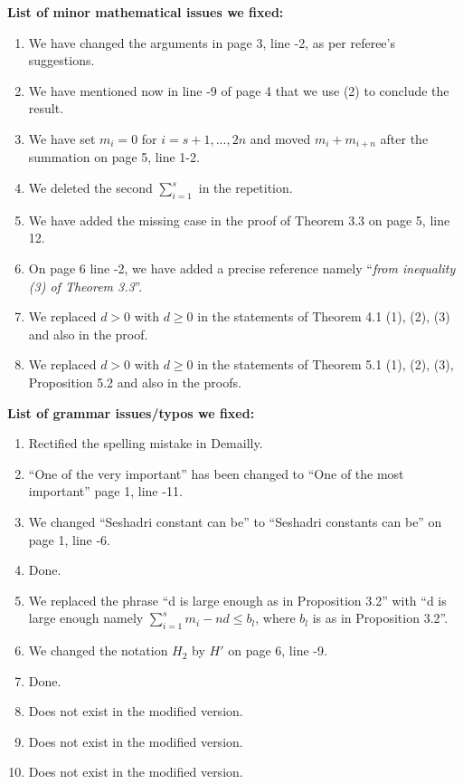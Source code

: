 \documentclass[12pt,twoside,reqno]{amsart}
\numberwithin{equation}{section}
\theoremstyle{definition}
\begin{document}
\textbf{List of minor mathematical issues we fixed:}
\begin{enumerate}
 \item We have changed the arguments in page 3, line -2, as per referee's suggestions.  
 \item We have mentioned now in line -9 of page 4 that we use (2) to conclude the result. 
 \item We have set $m_i = 0$ for $i = s+1,..., 2n$ and moved $m_i + m_{i+n}$ after the summation on page 5, line 1-2. 
 \item We deleted the second $\sum\limits_{i=1}^s$ in the repetition. 
 \item We have added the missing case in the proof of Theorem 3.3 on page 5, line 12. 
 \item On page 6 line -2, we have added a precise reference namely ``\textit{from inequality (3) of Theorem 3.3}''. 
 \item We replaced $d>0$ with $d \geq 0$ in the statements of Theorem 4.1 (1), (2), (3) and also in the proof. 
 \item We replaced $d>0$ with $d \geq 0$ in the statements of Theorem 5.1 (1), (2), (3), Proposition 5.2 and also in the proofs. 
\end{enumerate}

\textbf{List of grammar issues/typos we fixed:}
\begin{enumerate}
 \item Rectified the spelling mistake in Demailly. 
 \item ``One of the very important'' has been changed to ``One of the most important'' page 1, line -11.
 \item We changed ``Seshadri constant can be'' to ``Seshadri constants can be'' on page 1, line -6.
 \item Done.
 \item We replaced the phrase ``d is large enough as in Proposition 3.2'' with ``d is large enough namely 
 $\sum_{i=1}^s m_i - nd \leq b_l$, where $b_l$ is as in Proposition 3.2''.
 \item We changed the notation $H_2$ by $H'$ on page 6, line -9. 
 \item Done.
 \item Does not exist in the modified version.
 \item Does not exist in the modified version.
 \item Does not exist in the modified version.
\end{enumerate}
\end{document}
